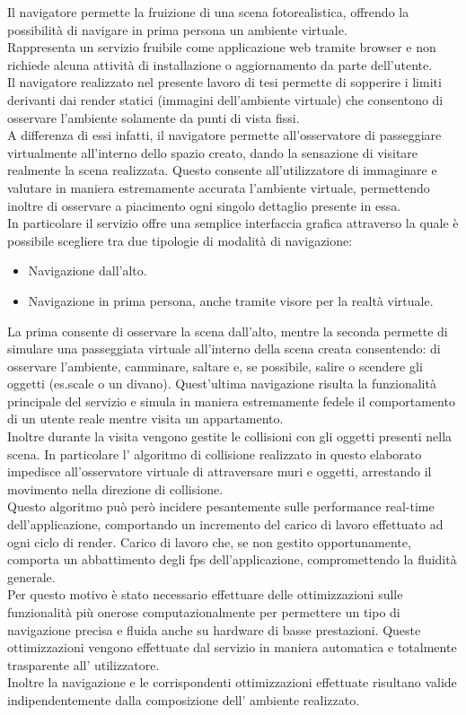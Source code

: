 Il navigatore permette la fruizione di una scena fotorealistica, offrendo la possibilità di navigare in prima persona un ambiente virtuale.
\\
Rappresenta un servizio fruibile come applicazione web tramite browser e non richiede alcuna attività di installazione o aggiornamento da parte dell’utente.
\\
Il navigatore realizzato nel presente lavoro di tesi permette di sopperire i limiti derivanti dai render statici (immagini dell’ambiente virtuale) che consentono di osservare l’ambiente solamente da punti di vista fissi.
\\
A differenza di essi infatti, il navigatore permette all’osservatore di passeggiare virtualmente all’interno dello spazio creato, dando la sensazione di visitare realmente la scena realizzata. 
Questo consente all’utilizzatore di immaginare e valutare in maniera estremamente accurata l’ambiente virtuale, permettendo inoltre di osservare a piacimento ogni singolo dettaglio presente in essa.
\\
In particolare il servizio offre una semplice interfaccia grafica attraverso la quale è possibile scegliere tra due tipologie di modalità di navigazione:
\begin{itemize}
\item Navigazione dall’alto.
\item Navigazione in prima persona, anche tramite visore per la realtà virtuale.
\end{itemize}
La prima consente di osservare la scena dall’alto, mentre la seconda permette di simulare una passeggiata virtuale all’interno della scena creata consentendo: di osservare l’ambiente, camminare, saltare e, se possibile, salire o scendere gli oggetti (es.scale o un divano). Quest’ultima navigazione risulta la funzionalità principale del servizio e simula in maniera estremamente fedele il comportamento di un utente reale mentre visita un appartamento.
\\
Inoltre durante la visita vengono gestite le collisioni con gli oggetti presenti nella scena.
In particolare l’ algoritmo di collisione realizzato in questo elaborato impedisce all’osservatore virtuale di attraversare muri e oggetti, arrestando il movimento nella direzione di collisione. 
\\
Questo algoritmo può però incidere pesantemente sulle performance real-time dell’applicazione, comportando un incremento del carico di lavoro effettuato ad ogni ciclo di render.
Carico di lavoro che, se non gestito opportunamente, comporta un abbattimento degli fps dell’applicazione, compromettendo la fluidità generale.
\\
Per questo motivo è stato necessario effettuare delle ottimizzazioni sulle funzionalità più onerose computazionalmente per permettere un tipo di navigazione precisa e fluida anche su hardware di basse prestazioni. Queste ottimizzazioni vengono effettuate dal servizio in maniera automatica e totalmente trasparente all’ utilizzatore.
\\ 
Inoltre la navigazione e le corrispondenti ottimizzazioni effettuate risultano valide indipendentemente dalla composizione dell’ ambiente realizzato.
\\

